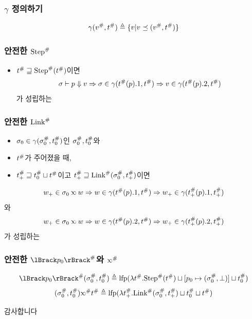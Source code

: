 \documentclass{beamer}
\begin{document}
\begin{frame}
	\frametitle{$\gamma$ 정의하기}
	\[\gamma({v}^{\#},{t}^{\#})\triangleq\{v|v\preceq({v}^{\#},{t}^{\#})\}\]
\end{frame}
\begin{frame}[c,fragile]
	\frametitle{안전한 ${\text{Step}}^{\#}$}
	\begin{itemize}
		\item ${t}^{\#}\sqsupseteq{\text{Step}}^{\#}({t}^{\#})$이면
		      \[{\sigma}\vdash{p}\Downarrow{v}\Rightarrow\sigma\in\gamma({t}^{\#}(p).1,{t}^{\#})\Rightarrow v\in\gamma({t}^{\#}(p).2,{t}^{\#})\]
		      가 성립하는
	\end{itemize}
\end{frame}
\begin{frame}[c,fragile]
	\frametitle{안전한 ${\text{Link}}^{\#}$}
	\begin{itemize}
		\item $\sigma_0\in\gamma({\sigma}^{\#}_0,{t}^{\#}_0)$인 ${\sigma}^{\#}_0,{t}^{\#}_0$와
		\item ${t}^{\#}$가 주어졌을 때,
    \item ${t}^{\#}_+\sqsupseteq{t}^{\#}_0\sqcup{t}^{\#}$이고 ${t}^{\#}_+\sqsupseteq{\text{Link}}^{\#}({\sigma}^{\#}_0,{t}^{\#}_+)$이면
	\end{itemize}
	\[w_+\in\ctx_0\semlink w\Rightarrow w\in\gamma(\Abs\ptree(p).1,\Abs\ptree)\Rightarrow w_+\in\gamma(\Abs\ptree_+(p).1,\Abs\ptree_+)\]
	와
	\[w_+\in\ctx_0\semlink w\Rightarrow w\in\gamma(\Abs\ptree(p).2,\Abs\ptree)\Rightarrow w_+\in\gamma(\Abs\ptree_+(p).2,\Abs\ptree_+)\]
	가 성립하는
\end{frame}
\begin{frame}
  \frametitle{안전한 $\Abs{\sembracket{p_0}}$와 $\Abs\semlink$}
  \[\Abs{\sembracket{p_0}}(\Abs\ctx_0,\Abs\ptree_0)\triangleq\lfp(\lambda\Abs\ptree.\Abs\Step(\Abs\ptree)\sqcup[p_0\mapsto(\Abs\ctx_0,\bot)]\sqcup\Abs\ptree_0)\]
  \[(\Abs\ctx_0,\Abs\ptree_0)\Abs\semlink\Abs\ptree\triangleq\lfp(\lambda\Abs\ptree_+.\Abs\Link(\Abs\ctx_0,\Abs\ptree_+)\sqcup\Abs\ptree_0\sqcup\Abs\ptree)\]
\end{frame}
\begin{frame}
	\begin{center}\LARGE
		감사합니다
	\end{center}
\end{frame}
\end{document}
